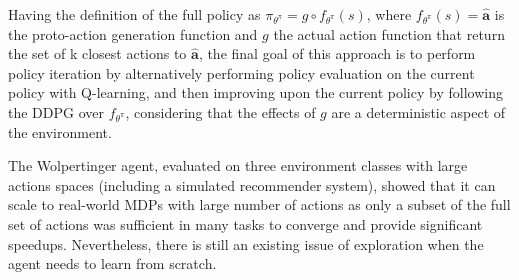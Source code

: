 Having the definition of the full policy as $\pi_{\theta^{\pi}} = g \circ f_{\theta^{\pi}}(s)$, where $f_{\theta^{\pi}}(s) = \hat{\mathbf{a}}$ is the proto-action generation function and $g$ the actual action function that return the set of k closest actions to $\hat{\mathbf{a}}$, the final goal of this approach is to perform policy iteration by alternatively performing policy evaluation on the current policy with Q-learning, and then improving upon the current policy by following the DDPG over $f_{\theta^{\pi}}$, considering that the effects of $g$ are a deterministic aspect of the environment. 

The Wolpertinger agent, evaluated on three environment classes with large actions spaces  (including a simulated recommender system), showed that it can scale to real-world MDPs with large number of actions as only a subset of the full set of actions was sufficient in many tasks to converge and provide significant speedups. Nevertheless, there is still an existing issue of exploration when the agent needs to learn from scratch.
